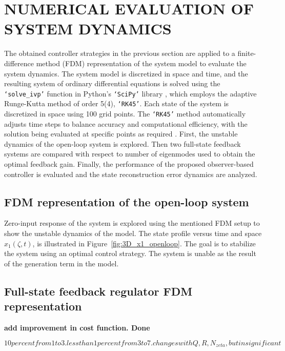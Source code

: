 \section{NUMERICAL EVALUATION OF SYSTEM DYNAMICS}

The obtained controller strategies in the previous section are applied to a finite-difference method (FDM) representation of the system model to evaluate the system dynamics. The system model is discretized in space and time, and the resulting system of ordinary differential equations is solved using the \texttt{`solve\_ivp'} function in Python's \texttt{`SciPy'} library \autocite{2020SciPy}, which employs the adaptive Runge-Kutta method of order 5(4), \texttt{`RK45'}. Each state of the system is discretized in space using 100 grid points. The \texttt{`RK45'} method automatically adjusts time steps to balance accuracy and computational efficiency, with the solution being evaluated at specific points as required \autocite{RK45_1,RK45_2}. First, the unstable dynamics of the open-loop system is explored. Then two full-state feedback systems are compared with respect to number of eigenmodes used to obtain the optimal feedback gain. Finally, the performance of the proposed observer-based controller is evaluated and the state reconstruction error dynamics are analyzed.

\subsection{FDM representation of the open-loop system}

Zero-input response of the system is explored using the mentioned FDM setup to show the unstable dynamics of the model. The state profile versus time and space $x_1(\zeta,t)$, is illustrated in Figure~\ref{fig:3D_x1_openloop}. The goal is to stabilize the system using an optimal control strategy. The system is unable as the result of the generation term in the model.

\subsection{Full-state feedback regulator FDM representation}

\textbf{add improvement in cost function. Done}

\begin{equation*}
    10 percent from 1 to 3. less than 1 percent from 3 to 7. changes with Q, R, N_{zeta}, but insignificant
\end{equation*}

